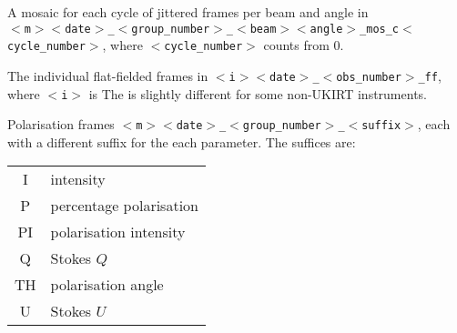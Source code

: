 \documentclass[twoside,11pt,nolof]{starlink}
\begin{document}
{{{         \sstitem
         A mosaic for each cycle of jittered frames per beam and angle in \\
         {\tt$<$m$>$$<$date$>$\_$<$group\_number$>$\_$<$beam$>$$<$angle$>$\_mos\_c$<$cycle\_number$>$}, where
         {\tt$<$cycle\_number$>$} counts from 0.

         \sstitem
         The individual flat-fielded frames in {\tt$<$i$>$$<$date$>$\_$<$obs\_number$>$\_ff},
         where {\tt$<$i$>$} is   The
          is slightly different for some non-UKIRT
         instruments.

         \sstitem
         Polarisation frames {\tt$<$m$>$$<$date$>$\_$<$group\_number$>$\_$<$suffix$>$}, each with a
         different suffix for the each parameter.  The suffices are:\\
         \begin{tabular}{cl}
             I &  intensity \\
             P &  percentage polarisation \\
             PI &  polarisation intensity \\
             Q  &  Stokes $Q$ \\
             TH & polarisation angle \\
             U  &  Stokes $U$ \\
         \end{tabular}

}}}
\end{document}
